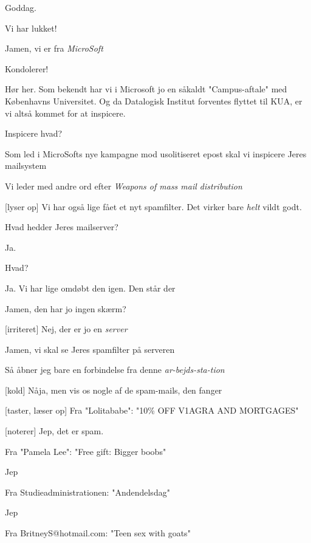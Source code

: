 \documentclass[a4paper,11pt]{article}
\begin{document}
\begin{sketch}

 Goddag.

 Vi har lukket!

 Jamen, vi er fra  \emph{MicroSoft}

 Kondolerer!

 Hør her. Som bekendt har vi i Microsoft jo en såkaldt
"Campus-aftale" med Københavns Universitet. Og da Datalogisk Institut
forventes flyttet til KUA, er vi altså kommet for at inspicere.

 Inspicere hvad?

 Som led i MicroSofts nye kampagne mod usolitiseret epost skal vi
inspicere Jeres mailsystem 

 Vi leder med andre ord efter \emph{Weapons of mass mail
  distribution}

[lyser op] Vi har også lige fået et nyt spamfilter. Det virker bare
\emph{helt} vildt godt.

 Hvad hedder Jeres mailserver?

 Ja. 

 Hvad?

 Ja. Vi har lige omdøbt den igen. Den står der 

 Jamen, den har jo ingen skærm?

[irriteret] Nej, der er jo en  \emph{server}

 Jamen, vi skal se Jeres spamfilter på serveren

 Så åbner jeg bare en forbindelse fra denne \emph{ar-bejds-sta-tion}

[kold] Nåja, men vis os nogle af de spam-mails, den fanger

[taster, læser op] Fra "Lolitababe": "10\% OFF V1AGRA AND MORTGAGES"

[noterer] Jep, det er spam.


 Fra "Pamela Lee": "Free gift: Bigger boobs"

 Jep

 Fra Studieadministrationen: "Andendelsdag"

 Jep

 Fra BritneyS@hotmail.com: "Teen sex with goats"


\end{sketch}
\end{document}
